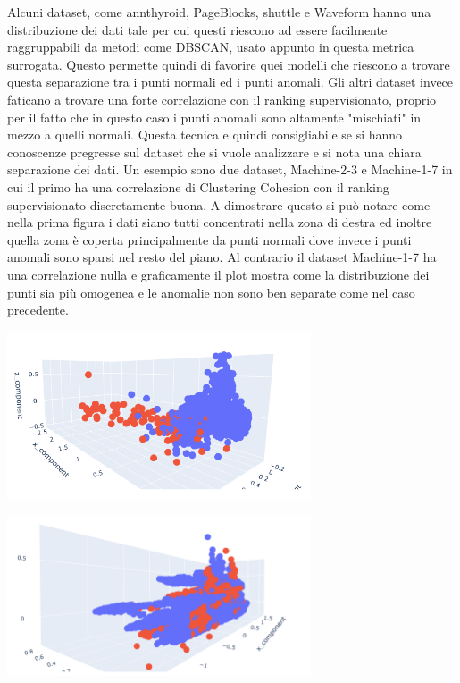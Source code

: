 Alcuni dataset, come annthyroid, PageBlocks, shuttle e Waveform hanno una distribuzione dei dati tale per cui questi riescono ad essere facilmente raggruppabili da metodi come DBSCAN, usato appunto in questa metrica surrogata. Questo permette quindi di favorire quei modelli che riescono a trovare questa separazione tra i punti normali ed i punti anomali.
Gli altri dataset invece faticano a trovare una forte correlazione con il ranking supervisionato, proprio per il fatto che in questo caso i punti anomali sono altamente "mischiati" in mezzo a quelli normali.
Questa tecnica e quindi consigliabile se si hanno conoscenze pregresse sul dataset che si vuole analizzare e si nota una chiara separazione dei dati. Un esempio sono due dataset, Machine-2-3 e Machine-1-7 in cui il primo ha una correlazione di Clustering Cohesion con il ranking supervisionato discretamente buona. A dimostrare questo si può notare come nella prima figura i dati siano tutti concentrati nella zona di destra ed inoltre quella zona è coperta principalmente da punti normali dove invece i punti anomali sono sparsi nel resto del piano. 
Al contrario il dataset Machine-1-7 ha una correlazione nulla e graficamente il plot mostra come la distribuzione dei punti sia più omogenea e le anomalie non sono ben separate come nel caso precedente. 
\begin{center}
	\includegraphics[width=9cm, scale=1]{images/scatter_cluster_good}
    \captionsetup{type=figure}
\end{center}
\begin{center}
	\includegraphics[width=9cm, scale=1]{images/scatter_cluster}
    \captionsetup{type=figure}
\end{center}

